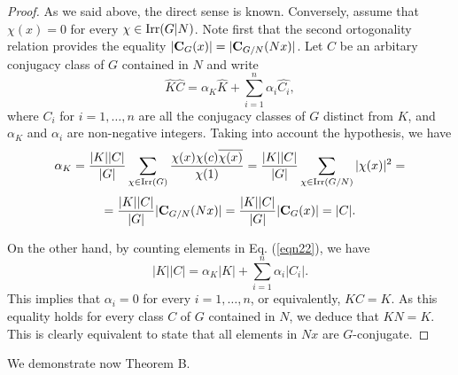 \documentclass[12pt,leqno,a4paper]{amsart}
\numberwithin{equation}{section}
\begin{document}
\begin{proof} As we said above, the direct sense is known. Conversely, assume that $\chi(x)=0$ for every $\chi \in {\rm Irr}(G|N)$. Note first that the second ortogonality relation  provides the equality $|{\bf C}_G(x)|=|{\bf C}_{G/N}(Nx)|$.  Let $C$ be an arbitary conjugacy class of $G$ contained in $N$ and write
\begin{equation} \label{eqn22}
\widehat{K}\widehat{C}=\alpha_K \widehat{K} + \sum_{i=1}^n \alpha_i\widehat{C_i},
\end{equation}
where $C_i$  for $i=1,\ldots , n$ are all the conjugacy classes of $G$ distinct from $K$, and $\alpha_K$ and $\alpha_i$ are non-negative integers. Taking into account the hypothesis, we have
$$\alpha_K = \frac{|K||C|}{|G|}\sum_{\chi\in {\rm Irr}(G)}\frac{\chi(x)\chi(c)\overline{\chi(x)}}{\chi(1)}= \frac{|K||C|}{|G|} \sum_{\chi\in {\rm Irr}(G/N)}|\chi(x)|^2= $$
$$=\frac{|K||C|}{|G|} |{\bf C}_{G/N}(Nx)|= \frac{|K||C|}{|G|}|{\bf C}_G(x)|=|C|.$$

On the other hand, by counting elements in Eq. (\ref{eqn22}), we have
$$|K||C|=\alpha_K|K| +\sum _{i=1}^n \alpha_i|C_i|.$$
 This implies that $\alpha_i=0$ for every $i=1,\ldots, n$, or equivalently, $KC=K$. As this equality holds for every class $C$ of $G$ contained in $N$, we deduce that $KN=K$. This is clearly equivalent to state that all elements in $Nx$ are $G$-conjugate.
 \end{proof}

We demonstrate now Theorem B.
\end{document}
